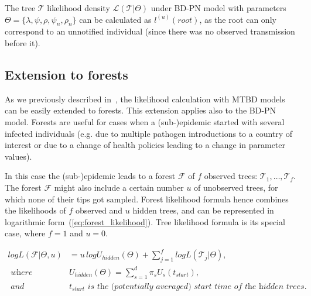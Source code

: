 \documentclass[a4paper,10pt]{article}
\begin{document}
\bigskip

The tree $\mathscr{T}$ likelihood density $\mathscr{L}(\mathscr{T}|\Theta)$ under BD-PN model with parameters $\Theta=\{\lambda, \psi, \rho, \psi_n, \rho_n\}$ can be calculated as $l^{(u)}(root)$, as the root can only correspond to an unnotified individual (since there was no observed transmission before it).



\subsection{Extension to forests}

As we previously described in~\citep{zhukovaFastAccurateMaximumLikelihood2022}, the likelihood calculation with MTBD models can be easily extended to forests. This extension applies also to the BD-PN model. Forests are useful for cases when a (sub-)epidemic started with several infected individuals (e.g. due to multiple pathogen introductions to a country of interest or due to a change of health policies leading to a change in parameter values).

In this case the (sub-)epidemic leads to a forest $\mathscr{F}$ of $f$ observed trees: $\mathscr{T}_1, \ldots, \mathscr{T}_f$. The forest $\mathscr{F}$ might also include a certain number $u$ of unobserved trees, for which none of their tips got sampled.
Forest likelihood formula hence combines the likelihoods of $f$ observed and $u$ hidden trees, and can be represented in logarithmic form~(\ref{eq:forest_likelihood}). Tree likelihood formula %
is its special case, where $f=1$ and $u=0$. 


\begin{equation}
\begin{split}
logL(\mathscr{F}|\Theta,u)&=u\,logU_{hidden}(\Theta) + \sum\limits_{j=1}^f logL(\mathscr{T}_j|\Theta), \\
\textit{ where }& U_{hidden}(\Theta)=\sum\limits_{s=1}^{d}\pi_s U_s(t_{start}),\\
\textit{ and }& t_{start} \textit{ is the (potentially averaged) start time of the hidden trees.}
\end{split} \label{eq:forest_likelihood} 
\end{equation}
\end{document}
